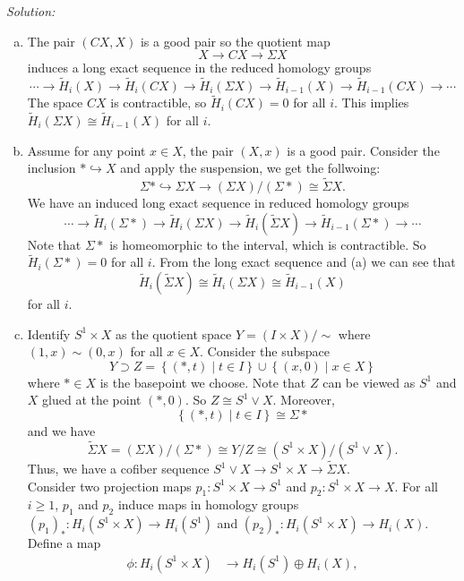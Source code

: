 \documentclass[a4paper, 12pt]{article}
\newenvironment{solution}
    {\textit{Solution:}}
    {}
\begin{document}
\begin{solution}
\begin{enumerate}[(a)]
\item The pair \((CX,X)\) is a good pair so the quotient map 
\[X\rightarrow CX\rightarrow \Sigma X\]
induces a long exact sequence in the reduced homology groups 
\[\cdots\rightarrow \tilde{H}_i(X)\rightarrow \tilde{H}_i(CX)\rightarrow \tilde{H}_i(\Sigma X)\rightarrow \tilde{H}_{i-1}(X)\rightarrow \tilde{H}_{i-1}(CX)\rightarrow \cdots\]
The space \(CX\) is contractible, so \(\tilde{H}_i(CX)=0\) for all \(i\). This implies \(\tilde{H}_i(\Sigma X)\cong \tilde{H}_{i-1}(X) \) for all \(i\). 
\item Assume for any point \(x\in X\), the pair \((X,x)\) is a good pair. Consider the inclusion \(*\hookrightarrow X\) and apply the suspension, we get the follwoing:
\[\Sigma *\hookrightarrow \Sigma X\rightarrow (\Sigma X)/(\Sigma *)\cong \tilde{\Sigma} X.\]
We have an induced long exact sequence in reduced homology groups 
\[\cdots\rightarrow \tilde{H}_i(\Sigma *)\rightarrow \tilde{H}_i(\Sigma X)\rightarrow \tilde{H}_i(\tilde{\Sigma }X)\rightarrow \tilde{H}_{i-1}(\Sigma *)\rightarrow \cdots\]
Note that \(\Sigma *\) is homeomorphic to the interval, which is contractible. So \(\tilde{H}_i(\Sigma *)=0\) for all \(i\). From the long exact sequence and (a) we can see that 
\[\tilde{H}_i(\tilde{\Sigma}X)\cong \tilde{H}_i(\Sigma X)\cong \tilde{H}_{i-1}(X)\]
for all \(i\). 
\item Identify \(S^1\times X\) as the quotient space \(Y=(I\times X)/\sim\) where \((1,x)\sim (0,x)\) for all \(x\in X\). Consider the subspace 
\[Y\supset Z=\left\{(*,t)\mid t\in I  \right\}\cup \left\{ (x,0)\mid x\in X \right\}\] 
where \(*\in X\) is the basepoint we choose. Note that \(Z\) can be viewed as \(S^1\) and \(X\) glued at the point \((*,0)\). So \(Z\cong S^1\vee X\). Moreover, 
\[\left\{ (*,t)\mid t\in I \right\}\cong \Sigma *\]
and we have 
\[\tilde{\Sigma} X=(\Sigma X)/(\Sigma *)\cong Y/Z\cong (S^1\times X)/(S^1\vee X).\]
Thus, we have a cofiber sequence \(S^1\vee X\rightarrow S^1\times X\rightarrow \tilde{\Sigma} X\).\\ 
Consider two projection maps \(p_1:S^1\times X\rightarrow S^1\) and \(p_2:S^1\times X\rightarrow X\). For all \(i\geq 1\), \(p_1\) and \(p_2\) induce maps in homology groups 
\((p_1)_*:H_i(S^1\times X)\rightarrow H_i(S^1)\) and \((p_2)_*:H_i(S^1\times X)\rightarrow H_i(X)\). Define a map 
\begin{align*}
    \phi:H_i(S^1\times X)&\rightarrow H_i(S^1)\oplus H_i(X),\\ 

\end{align*}
\end{enumerate}
\end{solution}
\end{document}
